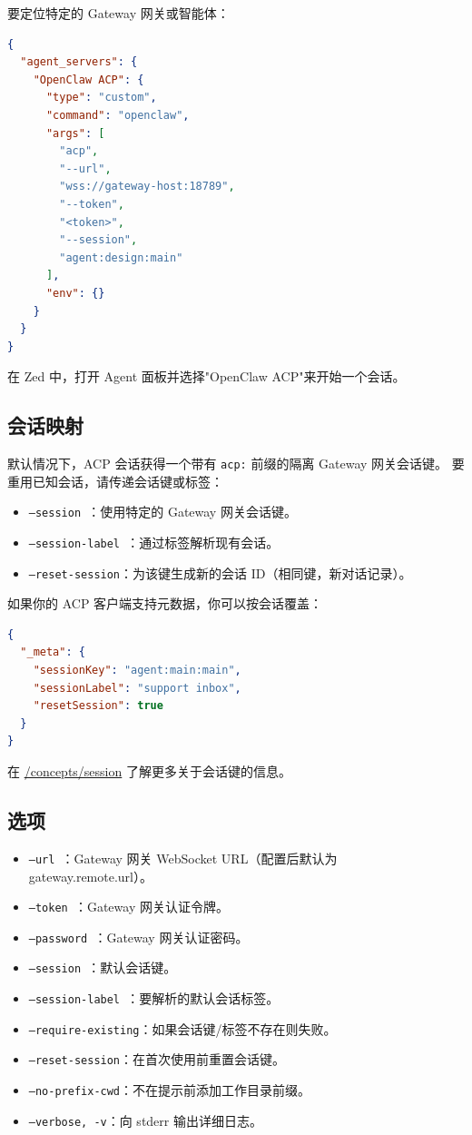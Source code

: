 要定位特定的 Gateway 网关或智能体：

\begin{lstlisting}[language=json]
{
  "agent_servers": {
    "OpenClaw ACP": {
      "type": "custom",
      "command": "openclaw",
      "args": [
        "acp",
        "--url",
        "wss://gateway-host:18789",
        "--token",
        "<token>",
        "--session",
        "agent:design:main"
      ],
      "env": {}
    }
  }
}
\end{lstlisting}


在 Zed 中，打开 Agent 面板并选择"OpenClaw ACP"来开始一个会话。

\subsection{会话映射}


默认情况下，ACP 会话获得一个带有 \texttt{acp:} 前缀的隔离 Gateway 网关会话键。
要重用已知会话，请传递会话键或标签：

\begin{itemize}
  \item \texttt{--session }：使用特定的 Gateway 网关会话键。
  \item \texttt{--session-label }：通过标签解析现有会话。
  \item \texttt{--reset-session}：为该键生成新的会话 ID（相同键，新对话记录）。
\end{itemize}


如果你的 ACP 客户端支持元数据，你可以按会话覆盖：

\begin{lstlisting}[language=json]
{
  "_meta": {
    "sessionKey": "agent:main:main",
    "sessionLabel": "support inbox",
    "resetSession": true
  }
}
\end{lstlisting}


在 \href{/concepts/session}{/concepts/session} 了解更多关于会话键的信息。

\subsection{选项}


\begin{itemize}
  \item \texttt{--url }：Gateway 网关 WebSocket URL（配置后默认为 gateway.remote.url）。
  \item \texttt{--token }：Gateway 网关认证令牌。
  \item \texttt{--password }：Gateway 网关认证密码。
  \item \texttt{--session }：默认会话键。
  \item \texttt{--session-label }：要解析的默认会话标签。
  \item \texttt{--require-existing}：如果会话键/标签不存在则失败。
  \item \texttt{--reset-session}：在首次使用前重置会话键。
  \item \texttt{--no-prefix-cwd}：不在提示前添加工作目录前缀。
  \item \texttt{--verbose, -v}：向 stderr 输出详细日志。
\end{itemize}



